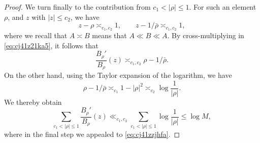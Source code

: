 \documentclass[reqno]{amsart} 
\begin{document}
\begin{proof}
  We turn finally to the contribution from $c_1 < \lvert \rho \rvert \leq 1$.  For such an element $\rho$, and $z$ with $\lvert z \rvert \leq c_2$, we have
  \begin{equation*}
    z - \rho \asymp _{c_1,c_2} 1, \qquad z - 1 / \bar{\rho } \asymp_{c_1,c_2} 1,
  \end{equation*}
  where we recall that $A \asymp B$ means that $A \ll B \ll A$.  By cross-multiplying in \eqref{eq:cj41z21ka5}, it follows that
  \begin{equation*}
    \frac{B_\rho '}{B_\rho }(z) \asymp_{c_1,c_2} \rho - 1 / \bar{\rho }.
  \end{equation*}
  On the other hand, using the Taylor expansion of the logarithm, we have
  \begin{equation*}
    \rho - 1 / \bar{\rho } \asymp_{c_1} 1 - |\rho|^2 \asymp_{c_2} \log \frac{1}{\lvert \rho \rvert}.
  \end{equation*}
  We thereby obtain
  \begin{equation}\label{eq:cj41z3ecu9}
    \sum_{c_1 < \lvert \rho  \rvert \leq 1} \frac{B_\rho '}{B_\rho }(z)
    \ll_{c_1, c_2}
    \sum_{c_1 < \lvert \rho  \rvert \leq 1}
    \log
    \frac{1}{\lvert \rho  \rvert}
    \leq
    \log M,
  \end{equation}
  where in the final step we appealed to \eqref{eq:cj41zzjhfa}.
\end{proof}




{} 
\end{document}
